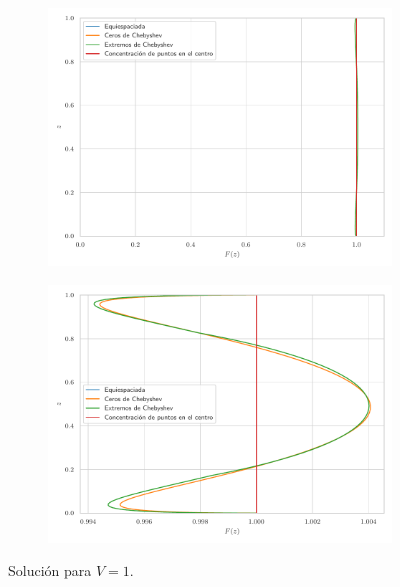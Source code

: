 \begin{figure}[h]
    \centering
    \begin{subfigure}[b]{0.45\textwidth}
        \centering
        \includegraphics[width=\textwidth]{Figures/01/sol_vol1_lejos.pdf}
        \caption{}
        \label{fig:sol_vol1_lejos}
    \end{subfigure}
    \hfill
    \begin{subfigure}[b]{0.45\textwidth}
        \centering
        \includegraphics[width=\textwidth]{Figures/01/sol_vol1_cerca.pdf}
        \caption{}
        \label{fig:sol_vol1_cerca}
    \end{subfigure}
    \caption{Solución para $V = 1$.}
    \label{fig:sol_vol1}
\end{figure}

